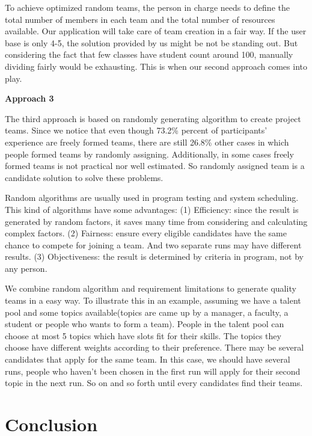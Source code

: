 \documentclass[conference]{IEEEtran}
\begin{document}
To achieve optimized random teams, the person in charge needs to define the total number of members in each team and the total number of resources available. Our application will take care of team creation in a fair way. If the user base is only 4-5, the solution provided by us might be not be standing out. But considering the fact that few classes have student count around 100, manually dividing fairly would be exhausting. This is when our second approach comes into play.

\textbf{Approach 3}

The third approach is based on randomly generating algorithm to create project teams. Since we notice that even though 73.2\% percent of participants' experience are freely formed teams, there are still 26.8\% other cases in which people formed teams by randomly assigning. Additionally, in some cases freely formed teams is not practical nor well estimated. So randomly assigned team is a candidate solution to solve these problems. 

Random algorithms are usually used in program testing
\cite{randomtest} and system scheduling\cite{lottery}. This kind of algorithms have some advantages:
(1) Efficiency: since the result is generated by random factors, it saves many time from considering and calculating complex factors.
(2) Fairness: ensure every eligible candidates have the same chance to compete for joining a team. And two separate runs may have different results.
(3) Objectiveness: the result is determined by criteria in  program, not by any person.

 We combine random algorithm and requirement limitations to generate quality teams in a easy way. To illustrate this in an example, assuming we have a talent pool and some topics available(topics are came up by a manager, a faculty, a student or people who wants to form a team). People in the talent pool can choose at most 5  topics which have slots fit for their skills. The topics they choose have different weights according to their preference. There may be several candidates that apply for the same team. In this case, we should have several runs, people who haven't been chosen in the first run will apply for their second topic in the next run. So on and so forth until every candidates find their teams.


\section{Conclusion}
\end{document}
